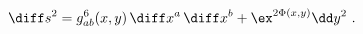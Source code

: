 \begin{equation}
   \diff s^2 = g^6_{ab}(x,y)\,\diff x^a \,\diff x^b + \ex^{2\Phi(x,y)}\dd y^2~.
\label{sixonemetric} 
\end{equation}

